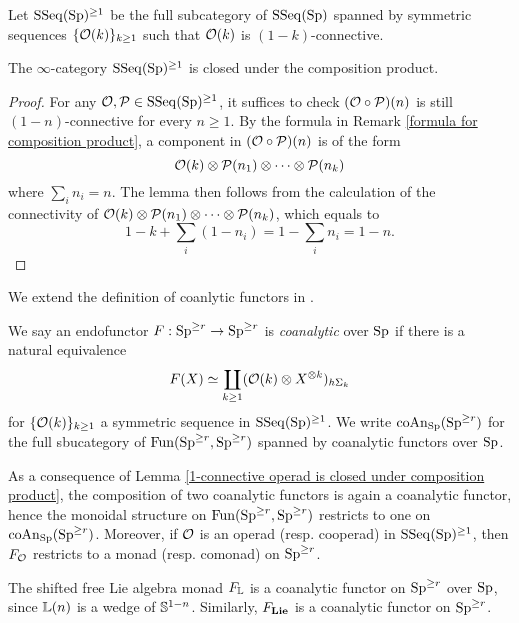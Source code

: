 Let $\operatorname{SSeq}(\operatorname{Sp})^{\geq 1}$ be the full subcategory of $\operatorname{SSeq}(\operatorname{Sp})$ spanned by symmetric sequences $\{{\mathcal{O}}(k)\}_{k \geq 1}$ such that ${\mathcal{O}}(k)$ is $(1-k)$-connective.
\begin{lemma}
\label{1-connective operad is closed under composition product}
	The $\infty$-category $\operatorname{SSeq}(\operatorname{Sp})^{\geq 1}$ is closed under the composition product.
\end{lemma}
\begin{proof}
	For any ${\mathcal{O}},{\mathcal{P}} \in \operatorname{SSeq}(\operatorname{Sp})^{\geq 1}$, it suffices to check $({\mathcal{O}} \circ {\mathcal{P}})(n)$ is still $(1-n)$-connective for every $n\geq 1$.
	By the formula in Remark \ref{formula for composition product}, a component in $({\mathcal{O}} \circ {\mathcal{P}})(n)$ is of the form
	$$
	{\mathcal{O}}(k) \otimes {\mathcal{P}}(n_1) \otimes \cdots \otimes {\mathcal{P}}(n_k)
	$$
	where $\sum_i n_i = n$. The lemma then follows from the calculation of the connectivity of 
	$	{\mathcal{O}}(k) \otimes {\mathcal{P}}(n_1) \otimes \cdots \otimes {\mathcal{P}}(n_k)$, which equals to 
	$$
	1- k + \sum_i (1-n_i)= 1 - \sum_in_i=1-n.
	$$
\end{proof}

We extend the definition of coanlytic functors in \cite[Definition 4.3]{heuts2018lie}.
\begin{definition}
\label{coanalytic functors on r-conn spectra}
We say an endofunctor $F:\operatorname{Sp}^{\geq r} \to \operatorname{Sp}^{\geq r}$ is \emph{coanalytic} over $\operatorname{Sp}$ if there is a natural equivalence
	$$
	F(X) \simeq
	\coprod_{k\geq 1} ({\mathcal{O}}(k)\otimes X^{\otimes k})_{h\Sigma_k}
	$$
	for $\{{\mathcal{O}}(k)\}_{k \geq 1}$ a symmetric sequence in $\operatorname{SSeq}(\operatorname{Sp})^{\geq 1}$. 
	We write $\operatorname{coAn}_{\operatorname{Sp}}(\operatorname{Sp}^{\geq r})$ for the full sbucategory of $\operatorname{Fun}(\operatorname{Sp}^{\geq r},\operatorname{Sp}^{\geq r})$ spanned by coanalytic functors over $\operatorname{Sp}$.
\end{definition}
As a consequence of Lemma \ref{1-connective operad is closed under composition product}, the composition of two coanalytic functors is again a coanalytic functor, hence the monoidal structure on $\operatorname{Fun}(\operatorname{Sp}^{\geq r}, \operatorname{Sp}^{\geq r})$ restricts to one on $\operatorname{coAn}_{\operatorname{Sp}}(\operatorname{Sp}^{\geq r})$.
Moreover, if ${\mathcal{O}}$ is an operad (resp. cooperad) in $\operatorname{SSeq}(\operatorname{Sp})^{\geq 1}$, then $F_{{\mathcal{O}}}$ restricts to a monad (resp. comonad) on $\operatorname{Sp}^{\geq r}$.

\begin{example}
	The shifted free Lie algebra monad $F_{{\mathbb{L}}}$ is a coanalytic functor on $\operatorname{Sp}^{\geq r}$ over $\operatorname{Sp}$, since ${\mathbb{L}}(n)$ is a wedge of ${\mathbb{S}}^{1-n}$.
	Similarly, $F_{\mathbf{Lie}}$ is a coanalytic functor on $\operatorname{Sp}^{\geq r}$.
\end{example}


